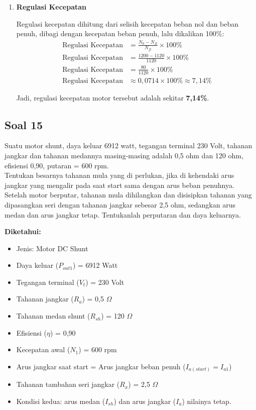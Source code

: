 \documentclass[12pt, a4paper]{article}
\begin{document}
\begin{enumerate}[label=\alph*.]
    Jadi, daya input pada waktu beban penuh adalah \textbf{8050 Watt}.

    \item \textbf{Regulasi Kecepatan}

    Regulasi kecepatan dihitung dari selisih kecepatan beban nol dan beban penuh, dibagi dengan kecepatan beban penuh, lalu dikalikan 100\%:
    \begin{align*}
        \text{Regulasi Kecepatan} &= \frac{N_0 - N_{fl}}{N_{fl}} \times 100\% \\
        \text{Regulasi Kecepatan} &= \frac{1200 - 1120}{1120} \times 100\% \\
        \text{Regulasi Kecepatan} &= \frac{80}{1120} \times 100\% \\
        \text{Regulasi Kecepatan} &\approx 0,0714 \times 100\% \approx 7,14\%
    \end{align*}

    Jadi, regulasi kecepatan motor tersebut adalah sekitar \textbf{7,14\%}.
\end{enumerate}

\subsection*{Soal 15}
Suatu motor shunt, daya keluar 6912 watt, tegangan terminal 230 Volt, tahanan jangkar dan tahanan medannya masing-masing adalah 0,5 ohm dan 120 ohm, efisiensi 0,90, putaran = 600 rpm.\\
Tentukan besarnya tahanan mula yang di perlukan, jika di kehendaki arus jangkar yang mengalir pada saat start sama dengan arus beban penuhnya.\\
Setelah motor berputar, tahanan mula dihilangkan dan disisipkan tahanan yang dipasangkan seri dengan tahanan jangkar sebesar 2,5 ohm, sedangkan arus medan dan arus jangkar tetap. Tentukanlah perputaran dan daya keluarnya.

\textbf{Diketahui:}
\begin{itemize}
    \item Jenis: Motor DC Shunt
    \item Daya keluar ($P_{out1}$) = 6912 Watt
    \item Tegangan terminal ($V_t$) = 230 Volt
    \item Tahanan jangkar ($R_a$) = 0,5 $\Omega$
    \item Tahanan medan shunt ($R_{sh}$) = 120 $\Omega$
    \item Efisiensi ($\eta$) = 0,90
    \item Kecepatan awal ($N_1$) = 600 rpm
    \item Arus jangkar saat start = Arus jangkar beban penuh ($I_{a(start)} = I_{a1}$)
    \item Tahanan tambahan seri jangkar ($R_x$) = 2,5 $\Omega$
    \item Kondisi kedua: arus medan ($I_{sh}$) dan arus jangkar ($I_a$) nilainya tetap.
\end{itemize}
\end{document}
